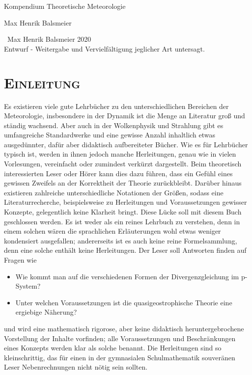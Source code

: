\documentclass{book}
\begin{document}
\thispagestyle{empty}
\begin{titlepage}
\vspace*{3 cm}
\begin{center}
{\huge Kompendium Theoretische Meteorologie\par}
\vspace{3 cm}
\vfill
\Large Max Henrik Balsmeier
\end{center}
\end{titlepage}
\newpage
\thispagestyle{empty}
\vspace*{15 cm}
\begin{center}
\textcopyright\ Max Henrik Balsmeier 2020\\
Entwurf - Weitergabe und Vervielfältigung jeglicher Art untersagt.
\end{center}
\pagestyle{toc}
\tableofcontents
\newpage
\thispagestyle{empty}

\pagestyle{normal}
\renewcommand{\chaptermark}[1]{\markboth{\thechapter.\ #1}{}}
\renewcommand{\sectionmark}[1]{\markright{\thesection.\ #1}}
\chapter{\normalfont\textsc{Einleitung}}
\label{chap:einleitung}

Es existieren viele gute Lehrbücher zu den unterschiedlichen Bereichen der Meteorologie, insbesondere in der Dynamik ist die Menge an Literatur groß und ständig wachsend. Aber auch in der Wolkenphysik und Strahlung gibt es umfangreiche Standardwerke und eine gewisse Anzahl inhaltlich etwas ausgedünnter, dafür aber didaktisch aufbereiteter Bücher. Wie es für Lehrbücher typisch ist, werden in ihnen jedoch manche Herleitungen, genau wie in vielen Vorlesungen, vereinfacht oder zumindest verkürzt dargestellt. Beim theoretisch interessierten Leser oder Hörer kann dies dazu führen, dass ein Gefühl eines gewissen Zweifels an der Korrektheit der Theorie zurückbleibt. Darüber hinaus existieren zahlreiche unterschiedliche Notationen der Größen, sodass eine Literaturrecherche, beispielsweise zu Herleitungen und Voraussetzungen gewisser Konzepte, gelegentlich keine Klarheit bringt. Diese Lücke soll mit diesem Buch geschlossen werden. Es ist weder als ein reines Lehrbuch zu verstehen, denn in einem solchen wären die sprachlichen Erläuterungen wohl etwas weniger kondensiert ausgefallen; andererseits ist es auch keine reine Formelsammlung, denn eine solche enthält keine Herleitungen. Der Leser soll Antworten finden auf Fragen wie
%
\begin{itemize}
\item Wie kommt man auf die verschiedenen Formen der Divergenzgleichung im p-System?
\item Unter welchen Voraussetzungen ist die quasigeostrophische Theorie eine ergiebige Näherung?
\end{itemize}
%
und wird eine mathematisch rigorose, aber keine didaktisch heruntergebrochene Vorstellung der Inhalte vorfinden; alle Voraussetzungen und Beschränkungen eines Konzepts werden klar als solche benannt. Die Herleitungen sind so kleinschrittig, das für einen in der gymnasialen Schulmathematik souveränen Leser Nebenrechnungen nicht nötig sein sollten.
\end{document}
